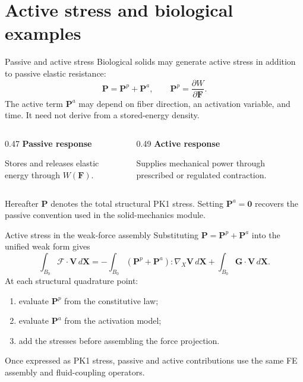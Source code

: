 \documentclass[aspectratio=169,11pt]{beamer}
\newcommand{\Xvec}{\bm{X}}
\newcommand{\Fvec}{\bm{\mathcal{F}}}
\newcommand{\Gvec}{\bm{G}}
\newcommand{\Vvec}{\bm{V}}
\newcommand{\Ften}{\bm{F}}
\newcommand{\Pten}{\bm{P}}
\newcommand{\Grad}{\nabla_{\!X}}
\begin{document}
\section{Active stress and biological examples}

\begin{frame}{Passive and active stress}
Biological solids may generate active stress in addition to passive elastic resistance:
\[
  \boxed{\Pten=\Pten^{p}+\Pten^{a}},
  \qquad
  \Pten^{p}=\frac{\partial W}{\partial\Ften}.
\]
The active term \(\Pten^a\) may depend on fiber direction, an activation variable, and time. It need not derive from a stored-energy density.
\begin{columns}[T,onlytextwidth]
\begin{column}{0.47\textwidth}
\textbf{Passive response}

Stores and releases elastic energy through \(W(\Ften)\).
\end{column}
\begin{column}{0.49\textwidth}
\textbf{Active response}

Supplies mechanical power through prescribed or regulated contraction.
\end{column}
\end{columns}
\medskip
\begin{punchbox}
\small Hereafter \(\Pten\) denotes the total structural PK1 stress. Setting \(\Pten^a=\bm{0}\) recovers the passive convention used in the solid-mechanics module.
\end{punchbox}
\end{frame}

\begin{frame}{Active stress in the weak-force assembly}
Substituting \(\Pten=\Pten^p+\Pten^a\) into the unified weak form gives
\[
  \int_{B_0}\Fvec\cdot\Vvec\,d\Xvec
  =
  -\int_{B_0}
  \left(\Pten^p+\Pten^a\right):\Grad\Vvec\,d\Xvec
  +\int_{B_0}\Gvec\cdot\Vvec\,d\Xvec .
\]
At each structural quadrature point:
\begin{enumerate}\itemsep5pt
  \item evaluate \(\Pten^p\) from the constitutive law;
  \item evaluate \(\Pten^a\) from the activation model;
  \item add the stresses before assembling the force projection.
\end{enumerate}
\medskip
\begin{punchbox}
\small Once expressed as PK1 stress, passive and active contributions use the same FE assembly and fluid-coupling operators.
\end{punchbox}
\end{frame}
\end{document}

